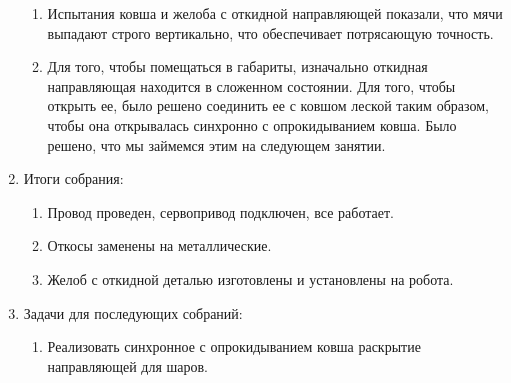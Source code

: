 \begin{enumerate}
\begin{enumerate}
        \item Испытания ковша и желоба с откидной направляющей показали, что мячи выпадают строго вертикально, что обеспечивает потрясающую точность. 
		
		\item Для того, чтобы помещаться в габариты, изначально откидная направляющая находится в сложенном состоянии. Для того, чтобы открыть ее, было решено соединить ее с ковшом леской таким образом, чтобы она открывалась синхронно с опрокидыванием ковша. Было решено, что мы займемся этим на следующем занятии.

	\end{enumerate}
	
	\item Итоги собрания:
	\begin{enumerate}
		
		\item Провод проведен, сервопривод подключен, все работает.
		
		\item Откосы заменены на металлические.
		
        \item Желоб с откидной деталью изготовлены и установлены на робота.
		
	\end{enumerate}
	
	\item Задачи для последующих собраний:
	\begin{enumerate}
		
		\item Реализовать синхронное с опрокидыванием ковша раскрытие направляющей для шаров.
			
	\end{enumerate}
\end{enumerate}
\fillpage
